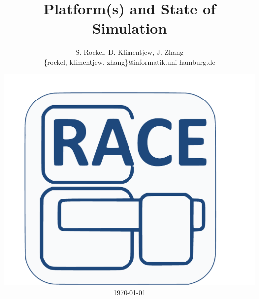 




\title[Platforms and Simulation]{Platform(s) and State of Simulation}


\author[S. Rockel, D. Klimentjew, J. Zhang]{S. Rockel, D. Klimentjew, J. Zhang\textbf{}\\
{\small \{rockel, klimentjew, zhang\}@informatik.uni-hamburg.de\vspace{-1em}
}}


\date{\includegraphics[width=0.13\paperwidth]{images/RACE_Logo_framed}\\
\today}

\makebeamertitle


